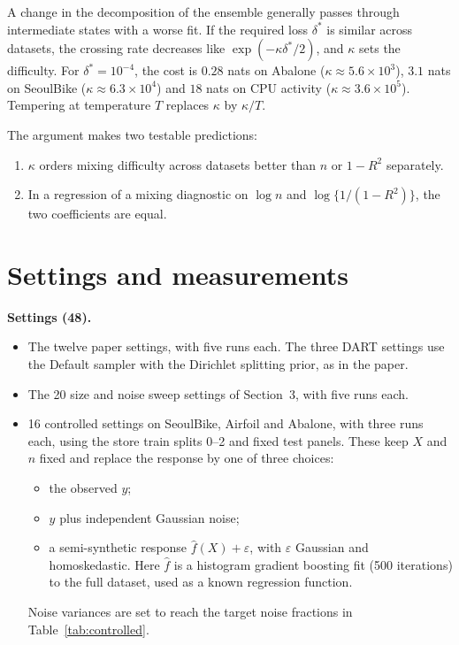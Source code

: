 \documentclass[11pt]{article}
\begin{document}
A change in the decomposition of the ensemble generally passes through intermediate states with a worse fit. If the required loss $\delta^\ast$ is similar across datasets, the crossing rate decreases like $\exp(-\kappa\delta^\ast/2)$, and $\kappa$ sets the difficulty. For $\delta^\ast=10^{-4}$, the cost is $0.28$ nats on Abalone ($\kappa\approx5.6\times10^3$), $3.1$ nats on SeoulBike ($\kappa\approx6.3\times10^4$) and $18$ nats on CPU activity ($\kappa\approx3.6\times10^5$). Tempering at temperature $T$ replaces $\kappa$ by $\kappa/T$.

The argument makes two testable predictions:
\begin{enumerate}
\item $\kappa$ orders mixing difficulty across datasets better than $n$ or $1-R^2$ separately.
\item In a regression of a mixing diagnostic on $\log n$ and $\log\{1/(1-R^2)\}$, the two coefficients are equal.
\end{enumerate}

\section{Settings and measurements}
\textbf{Settings (48).}
\begin{itemize}
\item The twelve paper settings, with five runs each. The three DART settings use the Default sampler with the Dirichlet splitting prior, as in the paper.
\item The 20 size and noise sweep settings of Section~3, with five runs each.
\item 16 controlled settings on SeoulBike, Airfoil and Abalone, with three runs each, using the store train splits 0--2 and fixed test panels. These keep $X$ and $n$ fixed and replace the response by one of three choices:
\begin{itemize}
\item the observed $y$;
\item $y$ plus independent Gaussian noise;
\item a semi-synthetic response $\hat f(X)+\varepsilon$, with $\varepsilon$ Gaussian and homoskedastic. Here $\hat f$ is a histogram gradient boosting fit (500 iterations) to the full dataset, used as a known regression function.
\end{itemize}
Noise variances are set to reach the target noise fractions in Table~\ref{tab:controlled}.
\end{itemize}
\end{document}
